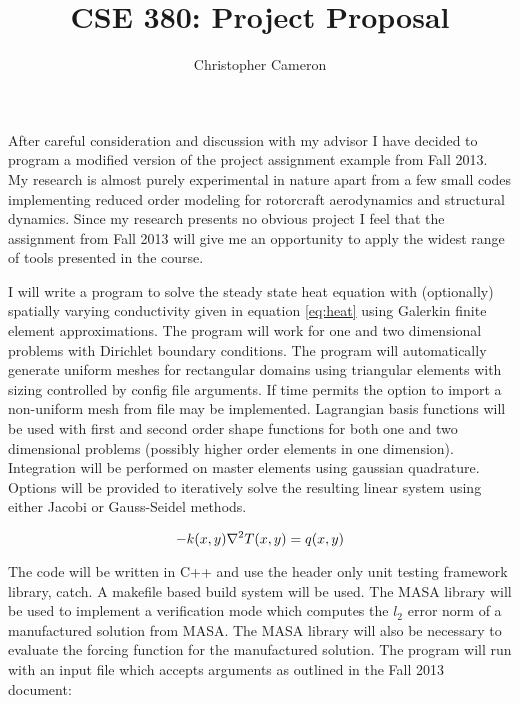 \documentclass[11pt, oneside]{article}   	%
\title{CSE 380: Project Proposal}
\author{Christopher Cameron}
\date{}							%
\begin{document}
\maketitle

After careful consideration and discussion with my advisor I have decided to program a modified version of the project assignment example from Fall 2013.  My research is almost purely experimental in nature apart from a few small codes implementing reduced order modeling for rotorcraft aerodynamics and structural dynamics.  Since my research presents no obvious project I feel that the assignment from Fall 2013 will give me an opportunity to apply the widest range of tools presented in the course.

I will write a program to solve the steady state heat equation with (optionally) spatially varying conductivity given in equation \ref{eq:heat} using Galerkin finite element approximations.  The program will work for one and two dimensional problems with Dirichlet boundary conditions.  The program will automatically generate uniform meshes for rectangular domains using triangular elements with sizing controlled by config file arguments.  If time permits the option to import a non-uniform mesh from file may be implemented.  Lagrangian basis functions will be used with first and second order shape functions for both one and two dimensional problems (possibly higher order elements in one dimension).  Integration will be performed on master elements using gaussian quadrature.  Options will be provided to iteratively solve the resulting linear system using either Jacobi or Gauss-Seidel methods.

\begin{equation}
\label{eq:heat}
   -k(x,y)\nabla^2T(x,y) = q(x,y)\\
\end{equation} 

The code will be written in C++ and use the header only unit testing framework library, catch.  A makefile based build system will be used.  The MASA library will be used to implement a verification mode which computes the $l_2$ error norm of a manufactured solution from MASA.  The MASA library will also be necessary to evaluate the forcing function for the manufactured solution.  The program will run with an input file which accepts arguments as outlined in the Fall 2013 document:
\end{document}

